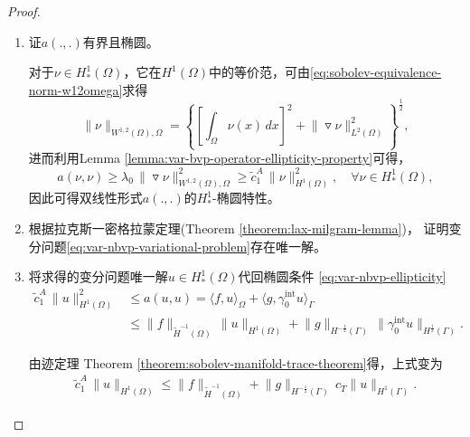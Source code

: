 \begin{proof}
\begin{enumerate}
\item 证$a(.,.)$有界且椭圆。

对于$\nu \in H_{*}^{1}(\Omega)$，它在$H^{1}(\Omega)$中的等价范，可由\eqref{eq:sobolev-equivalence-norm-w12omega}求得
\begin{equation*}
  \big\| \nu \big\|_{W^{1,2}(\Omega), \Omega} = \left\{
  \left[
  \int_{\Omega} \nu(x) \, dx
  \right]^2
  + \big\| \triangledown \nu \big\|^2_{L^2(\Omega)}
   \right\}^{\frac{1}{2}},
\end{equation*}
进而利用Lemma \ref{lemma:var-bvp-operator-ellipticity-property}可得，
\begin{equation}
  \label{eq:var-nbvp-ellipticity}
  a(\nu,\nu) \ge \lambda_0 \, \big\| \triangledown \nu \big\|_{W^{1,2}(\Omega), \Omega}^2 \ge \tilde{c}_{1}^{A} \, \big\| \nu \big\|_{H^{1}(\Omega)}^2, \quad \forall \nu \in H_{*}^{1}(\Omega),
\end{equation}
因此可得双线性形式$a(.,.)$的$H_{*}^{1}$-椭圆特性。

\item 根据拉克斯一密格拉蒙定理(Theorem \ref{theorem:lax-milgram-lemma})，
证明变分问题\eqref{eq:var-nbvp-variational-problem}存在唯一解。

\item 将求得的变分问题唯一解$u \in H_{*}^{1}(\Omega)$代回椭圆条件
\eqref{eq:var-nbvp-ellipticity}
\begin{equation*}
  \begin{split}
    \widetilde{c}_{1}^{A} \, \big\| u \big\|_{H^1(\Omega)}^2 & \le a(u,u) = \langle f, u \rangle_{\Omega} + \langle g, \gamma_{0}^{\text{int}} u \rangle_{\Gamma} \\
    & \le \big\| f \big\|_{\widetilde{H}^{-1}(\Omega)} \,
    \big\| u \big\|_{H^{1}(\Omega)}
    + \big\| g \big\|_{H^{- \frac{1}{2}}(\Gamma)} \,
    \big\| \gamma_{0}^{\text{int}} u \big\|_{H^{\frac{1}{2}}(\Gamma)}.
  \end{split}
\end{equation*}

由迹定理 Theorem \ref{theorem:sobolev-manifold-trace-theorem}得，上式变为
\begin{equation*}
  \begin{split}
    \widetilde{c}_{1}^{A} \, \big\| u \big\|_{H^1(\Omega)}
    \le \big\| f \big\|_{\widetilde{H}^{-1}(\Omega)} + \big\| g \big\|_{H^{-\frac{1}{2}}(\Gamma)} \,
    c_{T} \big\| u \big\|_{H^{1}(\Gamma)}.
  \end{split}
\end{equation*}
\end{enumerate}
\end{proof}




